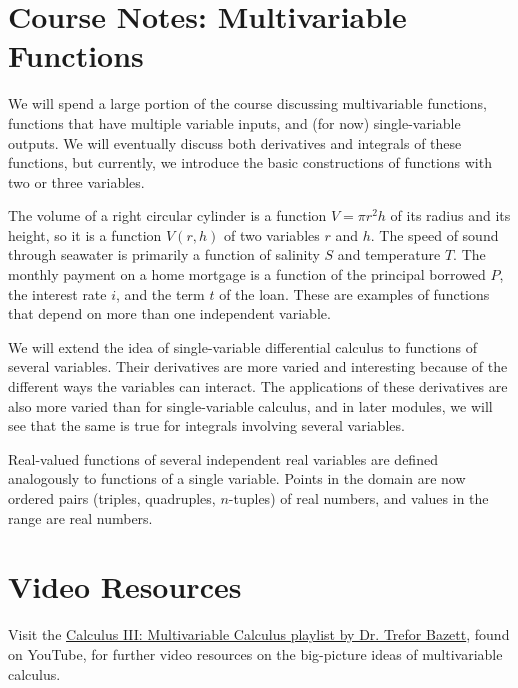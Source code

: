 \documentclass{ximera}
\begin{document}
\section{Course Notes: Multivariable Functions}

We will spend a large portion of the course discussing multivariable functions, functions that have multiple variable inputs, and (for now) single-variable outputs. We will eventually discuss both derivatives and integrals of these functions, but currently, we introduce the basic constructions of functions with two or three variables.

The volume of a right circular cylinder is a function $V=\pi r^2h$ of its radius and its height, so it is a function $V(r,h)$ of two variables $r$ and $h$. The speed of sound through seawater is primarily a function of salinity $S$ and temperature $T$. The monthly payment on a home mortgage is a function of the principal borrowed $P$, the interest rate $i$, and the term $t$ of the loan. These are examples of functions that depend on more than one independent variable.

\begin{center}
\end{center}

We will extend the idea of single-variable differential calculus to functions of several variables. Their derivatives are more varied and interesting because of the different ways the variables can interact. The applications of these derivatives are also more varied than for single-variable calculus, and in later modules, we will see that the same is true for integrals involving several variables.

Real-valued functions of several independent real variables are defined analogously to functions of a single variable. Points in the domain are now ordered pairs (triples, quadruples, $n$-tuples) of real numbers, and values in the range are real numbers.

\section{Video Resources}


Visit the \href{https://www.youtube.com/playlist?list=PLHXZ9OQGMqxc_CvEy7xBKRQr6I214QJcd}{Calculus III: Multivariable Calculus playlist by Dr. Trefor Bazett}, found on YouTube, for further video resources on the big-picture ideas of multivariable calculus.
\end{document}
